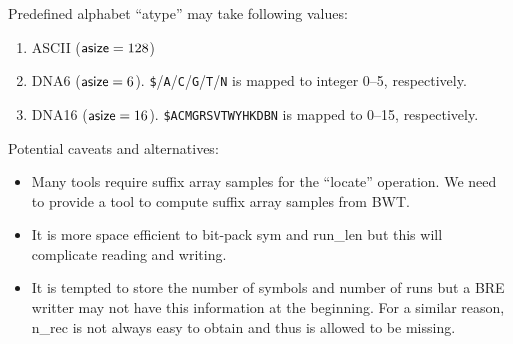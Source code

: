 \documentclass[10pt]{article}
\begin{document}
{\small
Predefined alphabet ``{\sf atype}'' may take following values:
\begin{enumerate}
\item {\sf ASCII} (${\sf asize}=128$)
\item {\sf DNA6} (${\sf asize}=6$). {\tt \$}/{\tt A}/{\tt C}/{\tt G}/{\tt T}/{\tt N} is mapped to integer 0--5, respectively.
\item {\sf DNA16} (${\sf asize}=16$). {\tt \$ACMGRSVTWYHKDBN} is mapped to 0--15, respectively.
\end{enumerate}

Potential caveats and alternatives:
\begin{itemize}
\item Many tools require suffix array samples for the ``locate'' operation.
  We need to provide a tool to compute suffix array samples from BWT.
\item It is more space efficient to bit-pack {\sf sym} and {\sf run\_len} but this will complicate reading and writing.
\item It is tempted to store the number of symbols and number of runs but a BRE writter may not have this information at the beginning.
  For a similar reason, {\sf n\_rec} is not always easy to obtain and thus is allowed to be missing.
\end{itemize}
}
\end{document}
